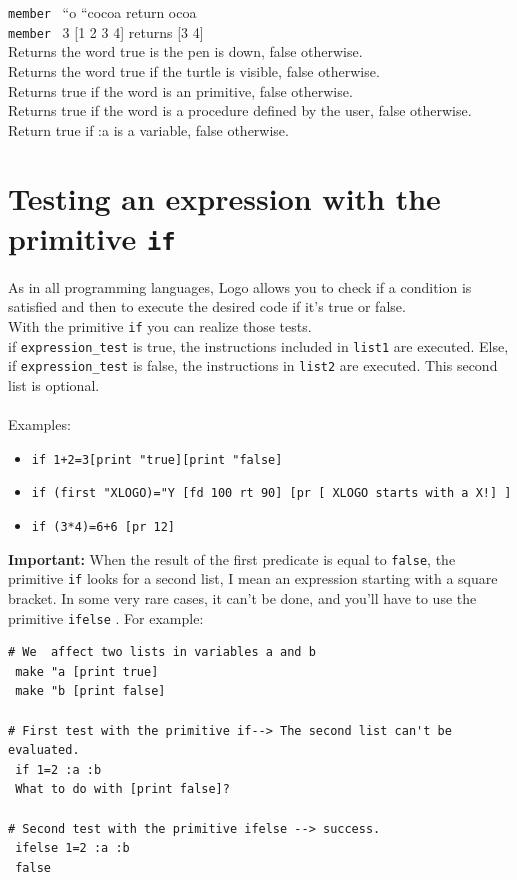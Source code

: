 \texttt{member} \ {}{}``o {}``cocoa return ocoa\\
 \texttt{member} \ 3 {[}1 2 3 4{]} returns {[}3 4{]}\\
Returns the word true is the pen is down, false otherwise.\\
Returns the word true if the turtle is visible, false otherwise.\\
Returns true if the word is an \xlogo primitive, false otherwise.\\
Returns true if the word is a procedure defined by the user, false otherwise.\\
Return true if :a is a variable, false otherwise.\\

\section{Testing an expression with the primitive \texttt{if}}
As in all programming languages, Logo allows you to check if a condition is satisfied and then to execute the desired code if it's true or false.
\\
With the primitive \texttt{if} you can realize those tests.\\
if \texttt{expression\_test} is true, the instructions included in \texttt{list1} are executed. Else, if \texttt{expression\_test} is false, the instructions in \texttt{list2} are executed. This second list is optional.\\ \\
Examples:
\begin{itemize}
\item \texttt{if 1+2=3[print "true][print "false]}
\item \texttt{if (first "XLOGO)="Y  [fd 100 rt 90] [pr [ XLOGO starts with a X!] ]}
\item \texttt{if (3*4)=6+6 [pr 12]}
\end{itemize}
\vspace{0.2cm}
\textbf{Important:} When the result of the first predicate is equal to \texttt{false}, the primitive \texttt{if} looks for a second list, I mean an expression starting with a square bracket. In some very rare cases, it can't be done, and you'll have to use the primitive \texttt{ifelse} . For example:
\begin{verbatim}
# We  affect two lists in variables a and b
 make "a [print true]
 make "b [print false]

# First test with the primitive if--> The second list can't be evaluated.
 if 1=2 :a :b 
 What to do with [print false]?

# Second test with the primitive ifelse --> success.
 ifelse 1=2 :a :b
 false
\end{verbatim}

